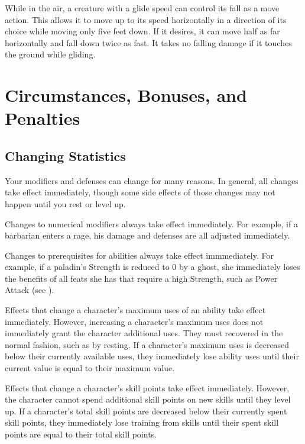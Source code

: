         While in the air, a creature with a glide speed can control its fall as a move action. This allows it to move up to its speed horizontally in a direction of its choice while moving only five feet down. If it desires, it can move half as far horizontally and fall down twice as fast. It takes no falling damage if it touches the ground while gliding.

\section{Circumstances, Bonuses, and Penalties}\label{Circumstances, Bonuses, and Penalties}

    \subsection{Changing Statistics}

        Your modifiers and defenses can change for many reasons.
        In general, all changes take effect immediately, though some side effects of those changes may not happen until you rest or level up.

         Changes to numerical modifiers always take effect immediately.
        For example, if a barbarian enters a rage, his damage and defenses are all adjusted immediately.

         Changes to prerequisites for abilities always take effect immmediately.
        For example, if a paladin's Strength is reduced to 0 by a ghost, she immediately loses the benefits of all feats she has that require a high Strength, such as Power Attack (see ).

         Effects that change a character's maximum uses of an ability take effect immediately.
        However, increasing a character's maximum uses does not immediately grant the character additional uses.
        They must recovered in the normal fashion, such as by resting.
        If a character's maximum uses is decreased below their currently available uses, they immediately lose ability uses until their current value is equal to their maximum value.

         Effects that change a character's skill points take effect immediately.
        However, the character cannot spend additional skill points on new skills until they level up.
        If a character's total skill points are decreased below their currently spent skill points, they immediately lose training from skills until their spent skill points are equal to their total skill points.

